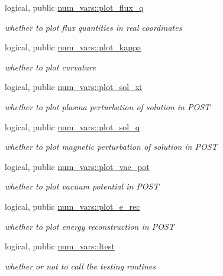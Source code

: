 \begin{DoxyCompactItemize}
logical, public \hyperlink{namespacenum__vars_a3b821da571f91f9ec665538209b995a6}{num\+\_\+vars\+::plot\+\_\+flux\+\_\+q}
\begin{DoxyCompactList}\small\item\em whether to plot flux quantities in real coordinates \end{DoxyCompactList}\item 
logical, public \hyperlink{namespacenum__vars_a15a00106d8f59e98ab924f905cf2ddac}{num\+\_\+vars\+::plot\+\_\+kappa}
\begin{DoxyCompactList}\small\item\em whether to plot curvature \end{DoxyCompactList}\item 
logical, public \hyperlink{namespacenum__vars_aca13a9c68dbf136ed2a2a8e0fa04c087}{num\+\_\+vars\+::plot\+\_\+sol\+\_\+xi}
\begin{DoxyCompactList}\small\item\em whether to plot plasma perturbation of solution in P\+O\+ST \end{DoxyCompactList}\item 
logical, public \hyperlink{namespacenum__vars_a478a829f8ec3af3e57e91bf48732a5e1}{num\+\_\+vars\+::plot\+\_\+sol\+\_\+q}
\begin{DoxyCompactList}\small\item\em whether to plot magnetic perturbation of solution in P\+O\+ST \end{DoxyCompactList}\item 
logical, public \hyperlink{namespacenum__vars_a641ae7ad0ef7673f5a3f6966d311d8cc}{num\+\_\+vars\+::plot\+\_\+vac\+\_\+pot}
\begin{DoxyCompactList}\small\item\em whether to plot vacuum potential in P\+O\+ST \end{DoxyCompactList}\item 
logical, public \hyperlink{namespacenum__vars_ae90f876bc701020d565d6e77c4dc8c61}{num\+\_\+vars\+::plot\+\_\+e\+\_\+rec}
\begin{DoxyCompactList}\small\item\em whether to plot energy reconstruction in P\+O\+ST \end{DoxyCompactList}\item 
logical, public \hyperlink{namespacenum__vars_a06597cae984d53aec80c150fc13d3e7f}{num\+\_\+vars\+::ltest}
\begin{DoxyCompactList}\small\item\em whether or not to call the testing routines \end{DoxyCompactList}\item 

\end{DoxyCompactItemize}

